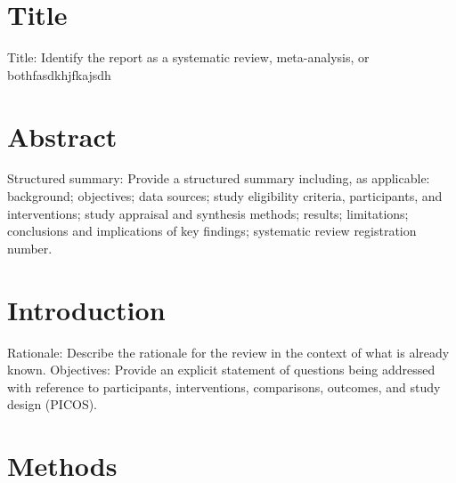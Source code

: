 \documentclass{article}\usepackage[]{graphicx}\usepackage[]{color}
\begin{document}
\section{Title}


Title: Identify the report as a systematic review, meta-analysis, or bothfasdkhjfkajsdh

\section{Abstract}

Structured summary: Provide a structured summary including, as applicable: background; objectives; data sources; study eligibility criteria, participants, and interventions; study appraisal and synthesis methods; results; limitations; conclusions and implications of key findings; systematic review registration number.

\section{Introduction}

Rationale: Describe the rationale for the review in the context of what is already known. Objectives: Provide an explicit statement of questions being addressed with reference to participants, interventions, comparisons, outcomes, and study design (PICOS).

\section{Methods}
\end{document}
